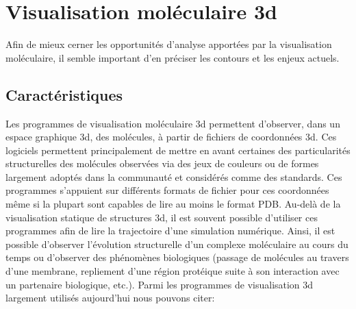 \section{Visualisation moléculaire 3d} \label{visu_molecular}

Afin de mieux cerner les opportunités d'analyse apportées par la visualisation moléculaire, il semble important d'en préciser les contours et les enjeux actuels.

\subsection{Caractéristiques}

Les programmes de visualisation moléculaire 3d permettent d'observer, dans un espace graphique 3d, des molécules, à partir de fichiers de coordonnées 3d. Ces logiciels permettent principalement de mettre en avant certaines des particularités structurelles des molécules observées via des jeux de couleurs ou de formes largement adoptés dans la communauté et considérés comme des standards. Ces programmes s'appuient sur différents formats de fichier pour ces coordonnées même si la plupart sont capables de lire au moins le format PDB. Au-delà de la visualisation statique de structures 3d, il est souvent possible d'utiliser ces programmes afin de lire la trajectoire d'une simulation numérique. Ainsi, il est possible d'observer l'évolution structurelle d'un complexe moléculaire au cours du temps ou d'observer des phénomènes biologiques (passage de molécules au travers d'une membrane, repliement d'une région protéique suite à son interaction avec un partenaire biologique, etc.). Parmi les programmes de visualisation 3d largement utilisés aujourd'hui nous pouvons citer: 
